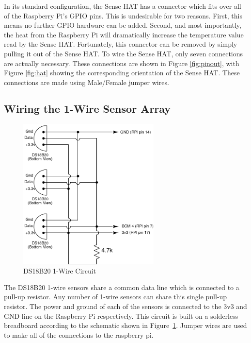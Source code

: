 \documentclass[journal]{new-aiaa}
\begin{document}
In its standard configuration, the Sense HAT has a connector which fits
over all of the Raspberry Pi's GPIO pins.  This is undesirable for two reasons.
First, this means no further GPIO hardware can be added.  Second, and
most importantly, the heat from the Raspberry Pi will dramatically
increase the temperature value read by the Sense HAT.  Fortunately, this
connector can be removed by simply pulling it out of the Sense HAT.
To wire the Sense HAT, only seven connections are actually necessary.
These connections are shown
in Figure \ref{fig:pinout}, with Figure \ref{fig:hat} showing
the corresponding orientation of the Sense HAT.  These connections are
made using Male/Female jumper wires.

\subsection{Wiring the 1-Wire Sensor Array}
\begin{figure}
    \centering
    \includegraphics[height=3.0in]{images/ds18b20-circuit}
    \caption{DS18B20 1-Wire Circuit}
    \label{fig:circuit}
\end{figure}
The DS18B20 1-wire sensors share a common data line which is connected
to a pull-up resistor.  Any number of 1-wire sensors can share this
single pull-up resistor.  The power and ground of each of the sensors
is connected to the 3v3 and GND line on the Raspberry Pi respectively.
This circuit is built on a solderless breadboard according to the
schematic shown in Figure~\ref{fig:circuit}. Jumper wires are used to
make all of the connections to the raspberry pi.
\end{document}
